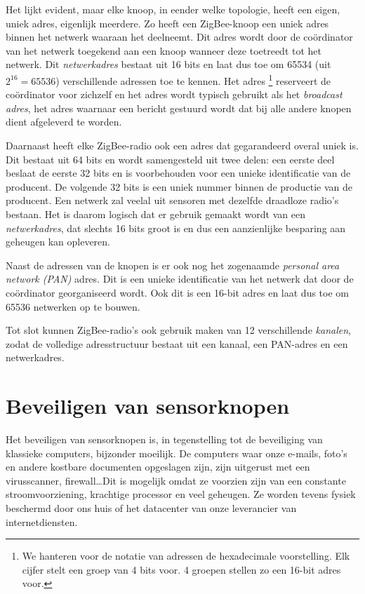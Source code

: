 Het lijkt evident, maar elke knoop, in eender welke topologie, heeft een eigen,
uniek adres, eigenlijk meerdere. Zo heeft een ZigBee-knoop een uniek adres
binnen het netwerk waaraan het deelneemt. Dit adres wordt door de co\"ordinator
van het netwerk toegekend aan een knoop wanneer deze toetreedt tot het netwerk.
Dit \emph{netwerkadres} bestaat uit 16 bits en laat dus toe om 65534 (uit
$2^{16} = 65536$) verschillende adressen toe te kennen. Het adres
\footnote{We hanteren voor de notatie van adressen de hexadecimale
voorstelling. Elk cijfer stelt een groep van 4 bits voor. 4 groepen stellen zo
een 16-bit adres voor.} reserveert de co\"ordinator voor zichzelf en het adres
 wordt typisch gebruikt als het \emph{broadcast adres}, het adres
waarnaar een bericht gestuurd wordt dat bij alle andere knopen dient afgeleverd
te worden.

Daarnaast heeft elke ZigBee-radio ook een adres dat gegarandeerd overal uniek
is. Dit bestaat uit 64 bits en wordt samengesteld uit twee delen: een eerste
deel beslaat de eerste 32 bits en is voorbehouden voor een unieke identificatie
van de producent. De volgende 32 bits is een uniek nummer binnen de productie
van de producent. Een netwerk zal veelal uit sensoren met dezelfde draadloze
radio's bestaan. Het is daarom logisch dat er gebruik gemaakt wordt van een
\emph{netwerkadres}, dat slechts 16 bits groot is en dus een aanzienlijke
besparing aan geheugen kan opleveren.

Naast de adressen van de knopen is er ook nog het zogenaamde \emph{personal
area network (PAN)} adres. Dit is een unieke identificatie van het netwerk dat
door de co\"ordinator georganiseerd wordt. Ook dit is een 16-bit adres en laat
dus toe om 65536 netwerken op te bouwen.

Tot slot kunnen ZigBee-radio's ook gebruik maken van 12 verschillende
\emph{kanalen}, zodat de volledige adresstructuur bestaat uit een kanaal, een
PAN-adres en een netwerkadres.

\section{Beveiligen van sensorknopen}
\label{section:beveiligen}

Het beveiligen van sensorknopen is, in tegenstelling tot de beveiliging van
klassieke computers, bijzonder moeilijk. De computers waar onze e-mails, foto's
en andere kostbare documenten opgeslagen zijn, zijn uitgerust met een
virusscanner, firewall\dots Dit is mogelijk omdat ze voorzien zijn van een
constante stroomvoorziening, krachtige processor en veel geheugen. Ze worden
tevens fysiek beschermd door ons huis of het datacenter van onze leverancier
van internetdiensten.

